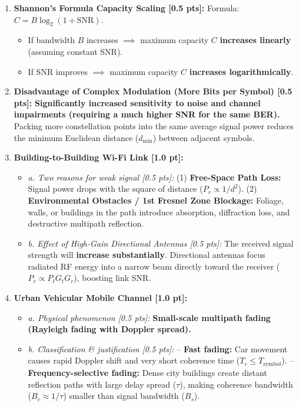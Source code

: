 \documentclass[10pt,a4paper]{article}
\begin{document}
\begin{enumerate}[leftmargin=14pt, itemsep=2.5pt, topsep=1pt]
    \item \textbf{Shannon's Formula Capacity Scaling [0.5 pts]:}  
    Formula: $C = B \log_2(1 + \text{SNR})$.  
    \begin{itemize}[leftmargin=10pt, itemsep=0.5pt]
        \item If bandwidth $B$ increases $\implies$ maximum capacity $C$ \textbf{increases linearly} (assuming constant SNR).
        \item If SNR improves $\implies$ maximum capacity $C$ \textbf{increases logarithmically}.
    \end{itemize}

    \item \textbf{Disadvantage of Complex Modulation (More Bits per Symbol) [0.5 pts]:}  
    \textbf{Significantly increased sensitivity to noise and channel impairments (requiring a much higher SNR for the same BER).} Packing more constellation points into the same average signal power reduces the minimum Euclidean distance ($d_{\min}$) between adjacent symbols.

    \item \textbf{Building-to-Building Wi-Fi Link [1.0 pt]:}  
    \begin{itemize}[leftmargin=10pt, itemsep=0.5pt]
        \item \textit{a. Two reasons for weak signal [0.5 pts]:}  
        (1) \textbf{Free-Space Path Loss:} Signal power drops with the square of distance ($P_r \propto 1/d^2$).  
        (2) \textbf{Environmental Obstacles / 1st Fresnel Zone Blockage:} Foliage, walls, or buildings in the path introduce absorption, diffraction loss, and destructive multipath reflection.
        \item \textit{b. Effect of High-Gain Directional Antennas [0.5 pts]:}  
        The received signal strength will \textbf{increase substantially}. Directional antennas focus radiated RF energy into a narrow beam directly toward the receiver ($P_r \propto P_t G_t G_r$), boosting link SNR.
    \end{itemize}

    \item \textbf{Urban Vehicular Mobile Channel [1.0 pt]:}  
    \begin{itemize}[leftmargin=10pt, itemsep=0.5pt]
        \item \textit{a. Physical phenomenon [0.5 pts]:} \textbf{Small-scale multipath fading (Rayleigh fading with Doppler spread).}
        \item \textit{b. Classification \& justification [0.5 pts]:}  
        -- \textbf{Fast fading:} Car movement causes rapid Doppler shift and very short coherence time ($T_c \le T_{\text{symbol}}$).  
        -- \textbf{Frequency-selective fading:} Dense city buildings create distant reflection paths with large delay spread ($\tau$), making coherence bandwidth ($B_c \approx 1/\tau$) smaller than signal bandwidth ($B_s$).
    \end{itemize}


\end{enumerate}
\end{document}
